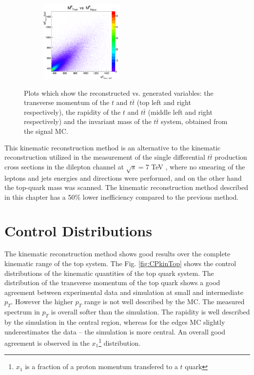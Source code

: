 \begin{figure}[t]
\begin{subfigure}
\end{subfigure}
\begin{subfigure}
  \centering
  \includegraphics[width=0.45\textwidth]{05_kinReco/plots/scatter/mtt-scaterPlot.png}
\end{subfigure}
\caption{Plots which show the reconstructed vs. generated variables: the transverse momentum of the $t$ and $t\bar{t}$ (top left and right respectively), 
        the rapidity of the $t$ and $t\bar{t}$ (middle left and right respectively) and the invariant mass of the $t\bar{t}$ system, obtained from the 
        signal MC.}
\label{fig:ScatterPl}
\end{figure}

This kinematic reconstruction method is an alternative to the kinematic reconstruction utilized in the measurement of the single differential $t\bar{t}$
production cross sections in the dilepton channel at $\sqrt{s} = $7 TeV \cite{Chatrchyan:2012saa}, where no smearing of the leptons and 
jets energies and directions were performed, and on the other hand the top-quark mass was scanned. The kinematic reconstruction method described
in this chapter has a 50\% lower inefficiency compared to the previous method.

\section{Control Distributions}

The kinematic reconstruction method shows good results over the complete kinematic range of the top system. The Fig. \ref{fig:CPkinTop} shows
the control distributions of the kinematic quantities of the top quark system. The distribution of the transverse momentum of the top quark
shows a good agreement between experimental data and simulation at small and intermediate $p_{T}$. However the higher $p_{T}$ range is not well
described by the MC. The measured spectrum in $p_{T}$ is overall softer than the simulation. The rapidity is well described by the simulation in the central region, 
whereas for the edges MC slightly underestimates the data -- the simulation is more central.
An overall good agreement is observed in the  $x_{1}$\footnote{ $x_{1}$ is a fraction of a proton momentum transfered to a $t$ quark} 
distribution.

